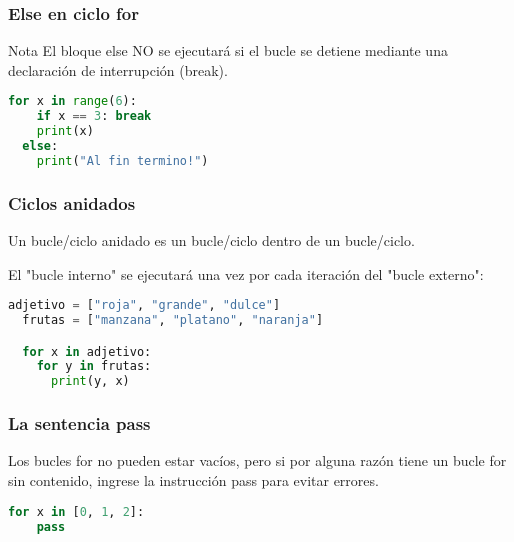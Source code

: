 \begin{frame}[fragile]
  \frametitle{\textbf{Else} en ciclo \textbf{for}}

  \begin{alertblock}{Nota}
    El bloque else NO se ejecutará si el bucle se detiene
    mediante una declaración de interrupción (break).
  \end{alertblock}

  \vspace{\baselineskip}
  \begin{lstlisting}[language=Python]
  for x in range(6):
    if x == 3: break
    print(x)
  else:
    print("Al fin termino!")
  \end{lstlisting}
\end{frame}

\begin{frame}[fragile]
  \frametitle{Ciclos anidados}

  Un bucle/ciclo anidado es un bucle/ciclo dentro de un bucle/ciclo.

  \vspace{\baselineskip}
  El "bucle interno" se ejecutará una vez por cada iteración del
  "bucle externo":

  \vspace{\baselineskip}
  \begin{lstlisting}[language=Python]
  adjetivo = ["roja", "grande", "dulce"]
  frutas = ["manzana", "platano", "naranja"]

  for x in adjetivo:
    for y in frutas:
      print(y, x)
  \end{lstlisting}
\end{frame}

\begin{frame}[fragile]
  \frametitle{La sentencia \textbf{pass}}

  Los bucles for no pueden estar vacíos, pero si por alguna
  razón tiene un bucle for sin contenido, ingrese la instrucción
  pass para evitar errores.

  \vspace{\baselineskip}
  \begin{lstlisting}[language=Python]
  for x in [0, 1, 2]:
    pass
  \end{lstlisting}
\end{frame}
